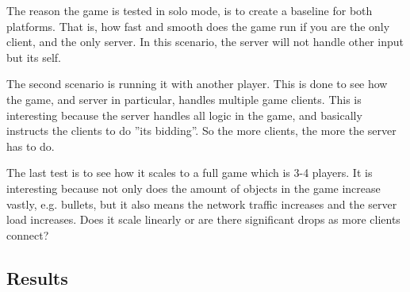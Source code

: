 The reason the game is tested in solo mode, is to create a baseline for both platforms. That is, how fast and smooth does the game run if you are the only client, and the only server. In this scenario, the server will not handle other input but its self.

The second scenario is running it with another player. This is done to see how the game, and server in particular, handles multiple game clients. This is interesting because the server handles all logic in the game, and basically instructs the clients to do ''its bidding''. So the more clients, the more the server has to do. 

The last test is to see how it scales to a full game which is 3-4 players. It is interesting because not only does the amount of objects in the game increase vastly, e.g. bullets, but it also means the network traffic increases and the server load increases. Does it scale linearly or are there significant drops as more clients connect?

\subsection{Results}

